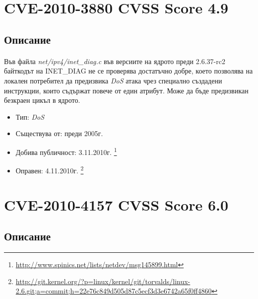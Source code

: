 \documentclass[a4paper,12pt,leqno]{article}
\begin{document}


\section{CVE-2010-3880 CVSS Score 4.9}
\subsection{Описание}
\paragraph{}
Във файла \textit{net/ipv4/inet\_diag.c} във версиите на ядрото преди 2.6.37-rc2 байткодът на INET\_DIAG не се проверява достатъчно добре,
което позволява на локален потребител да предизвика \textit{DoS} атака чрез специално създадени инструкции, които съдържат
повече от един атрибут. Може да бъде предизвикан безкраен цикъл в ядрото.
\begin{itemize}
    \item Тип: \textit{DoS}
    \item Съществува от: преди 2005г.
    \item Добива публичност: 3.11.2010г. \footnote{\url{http://www.spinics.net/lists/netdev/msg145899.html}}
    \item Оправен: 4.11.2010г. \footnote{\url{http://git.kernel.org/?p=linux/kernel/git/torvalds/linux-2.6.git;a=commit;h=22e76c849d505d87c5ecf3d3e6742a65f0ff4860}}
\end{itemize}

\section{CVE-2010-4157 CVSS Score 6.0}
\subsection{Описание}
\end{document}
